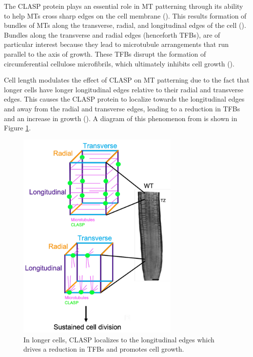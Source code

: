 \medskip

The CLASP protein plays an essential role in MT patterning through its ability to help MTs cross sharp edges on the cell membrane (\cite{ambrose2011}). 
This results formation of bundles of MTs along the transverse, radial, and longitudinal edges of the cell (\cite{halat2022}). 
Bundles along the transverse and radial edges (henceforth TFBs), are of particular interest because they lead to microtubule arrangements that run parallel to the axis of growth.
These TFBs disrupt the formation of circumferential cellulose microfibrils, which ultimately inhibits cell growth (\cite{halat2022}).

\medskip

Cell length modulates the effect of CLASP on MT patterning due to the fact that longer cells have longer longitudinal edges relative to their radial and transverse edges. This causes the CLASP protein to localize towards the longitudinal edges and away from the radial and transverse edges, leading to a reduction in TFBs and an increase in growth (\cite{halat2022}). A diagram of this phenomenon from \cite{halat2022} is shown in Figure \ref{fig:clasp-length-effect}.

\begin{figure}
    \centering
    \includegraphics[width=8cm]{img/clasp-length-effect.png}
    \caption{In longer cells, CLASP localizes to the longitudinal edges which drives a reduction in TFBs and promotes cell growth.}
    \label{fig:clasp-length-effect}
\end{figure}


